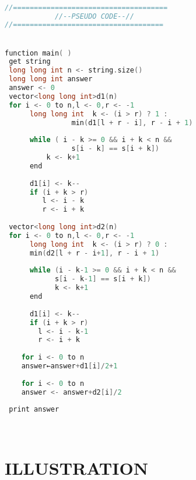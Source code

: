 \documentclass[conference]{IEEEtran}
\begin{document}
\begin{lstlisting}[caption=Algorithm 4, style=chstyle, language=c++]

//=====================================
            //--PSEUDO CODE--//
//====================================


function main( )
 get string 
 long long int n <- string.size()
 long long int answer
 answer <- 0
 vector<long long int>d1(n)
 for i <- 0 to n,l <- 0,r <- -1 
      long long int  k <- (i > r) ? 1 : 
                min(d1[l + r - i], r - i + 1)
                
      while ( i - k >= 0 && i + k < n && 
                s[i - k] == s[i + k]) 
          k <- k+1
      end
      
      d1[i] <- k--
      if (i + k > r) 
         l <- i - k
         r <- i + k
 
 vector<long long int>d2(n)
 for i <- 0 to n,l <- 0,r <- -1 
      long long int  k <- (i > r) ? 0 : 
      min(d2[l + r - i+1], r - i + 1)
      
      while (i - k-1 >= 0 && i + k < n && 
            s[i - k-1] == s[i + k]) 
            k <- k+1
      end
      
      d1[i] <- k--
      if (i + k > r) 
        l <- i - k-1
        r <- i + k
           
    for i <- 0 to n
	answer←answer+d1[i]/2+1
	
    for i <- 0 to n
	answer <- answer+d2[i]/2
 
 print answer




\end{lstlisting}


\section*{ILLUSTRATION}
\end{document}
